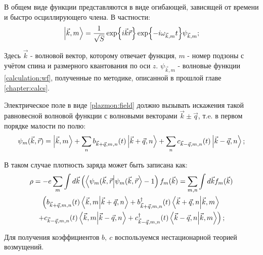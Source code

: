 \documentclass[../main.tex]{subfiles}
\begin{document}
    В общем виде функции представляются в виде огибающей, зависящей 
    от времени и быстро осциллирующего члена. В частности:
    \begin{equation}
        \label{plasmons:wf0}
        \ket{\vec k, m} = \frac{1}{\sqrt S} \exp{i\vec k \vec r}
            \exp{-i \omega_{\vec k, m} t} \psi_{\vec k, m};
    \end{equation}

    Здесь $\vec k$ - волновой вектор, которому отвечает функция, 
    $m$ - номер подзоны с учётом спина и размерного квантования 
    по оси $z$. $\psi_{\vec k, m}$ - волновые функции
    \ref{calculation:wf}, полученные по методике, 
    описанной в прошлой главе \ref{chapter:calcs}. 

    Электрическое поле в виде \ref{plazmon:field} должно вызывать 
    искажения 
    такой равновесной волновой функции с волновыми векторами
    $\vec k \pm \vec q$, т.e. в первом порядке малости по полю:
    \begin{equation}
        \label{plasmons:wf1}
        \psi_m (\vec k, \vec r) = \ket{\vec k, m} + \sum_n b_{\vec k 
            + \vec q, m, n} (t) \ket{\vec k + \vec q, n} + \sum_n 
            c_{\vec k - \vec q, m, n} (t) \ket{\vec k - \vec q, n};
    \end{equation}

    В таком случае плотность заряда может быть записана как:
    \begin{multline}
        \label{charge_density}
        \rho = -e \sum_{m} \int d\vec k  \left(
            \bra{\psi_m (\vec k, \vec r}\ket{\psi_m (\vec k, 
            \vec r} - 1\right) f_m(\vec k) =
            \sum_{m, n} \int d \vec k f_m (\vec k) \\
            \left( b_{\vec k + \vec q, m, n} (t)
            \bra{\vec k, m} \ket{\vec k 
            + \vec q, n} + b^\dagger_{\vec k + \vec q, m, n} (t) 
            \bra{\vec k + \vec q, n} \ket{\vec k, m}\right.\\ 
            \left. + c_{\vec k - \vec q, m, n} (t) \bra{\vec k, m} 
            \ket{\vec k  - \vec q, n} + c^\dagger_{\vec k - \vec q, m, n} 
            (t) \bra{\vec k - \vec q, n} \ket{\vec k, m} \right);
    \end{multline}
    
    Для получения коэффициентов $b,~c$ воспользуемся нестационарной 
    теорией возмущений.
\end{document}

